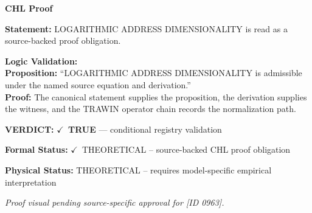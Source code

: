 \vspace{0.45em}
\noindent\textbf{CHL Proof}\par
\textbf{Statement:} LOGARITHMIC ADDRESS DIMENSIONALITY is read as a source-backed proof obligation.

\textbf{Logic Validation:}\\
\textbf{Proposition:} ``LOGARITHMIC ADDRESS DIMENSIONALITY is admissible under the named source equation and derivation.''\\
\textbf{Proof:} The canonical statement supplies the proposition, the derivation supplies the witness, and the TRAWIN operator chain records the normalization path.

\textbf{VERDICT:} \ensuremath{\checkmark}\ \textbf{TRUE} --- conditional registry validation

\textbf{Formal Status:} \ensuremath{\checkmark}\ THEORETICAL -- source-backed CHL proof obligation

\textbf{Physical Status:} THEORETICAL -- requires model-specific empirical interpretation
\par\vspace{0.45em}
\par
\vfill
\begingroup\footnotesize\itshape
Proof visual pending source-specific approval for [ID 0963].
\par\endgroup
\vfill
\endgroup
\endgroup
